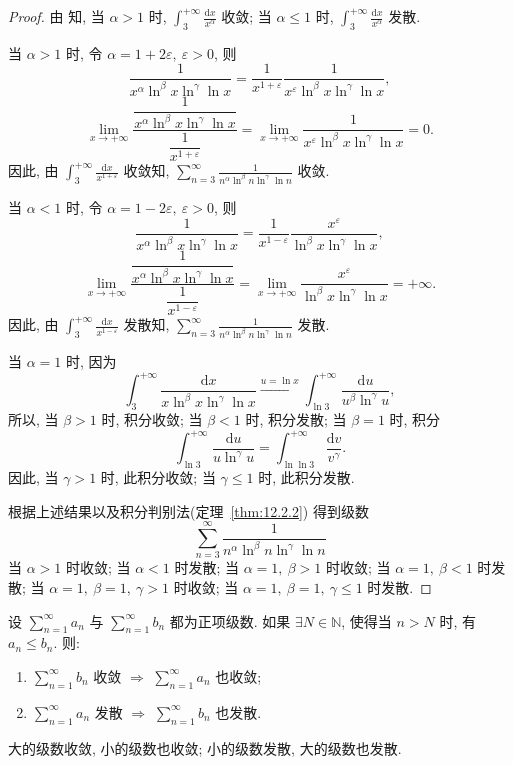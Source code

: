 \begin{proof}
由 知, 当 $\alpha>1$ 时, $\int_{3}^{+\infty}\frac{\mathrm{d}x}{x^{\alpha}}$ 收敛; 当 $\alpha\leqslant1$ 时, $\int_{3}^{+\infty}\frac{\mathrm{d}x}{x^{\alpha}}$ 发散.

当 $\alpha>1$ 时, 令 $\alpha=1+2\varepsilon,\ \varepsilon>0$, 则
\[
  \frac{1}{x^{\alpha}\ln^{\beta}x\ln^{\gamma}\ln x}
  =\frac{1}{x^{1+\varepsilon}}\frac{1}{x^{\varepsilon}\ln^{\beta}x\ln^{\gamma}\ln x},
\]
\[
  \lim_{x\to+\infty}\frac{\dfrac{1}{x^{\alpha}\ln^{\beta}x\ln^{\gamma}\ln x}}{\dfrac{1}{x^{1+\varepsilon}}}
  =\lim_{x\to+\infty}\frac{1}{x^{\varepsilon}\ln^{\beta}x\ln^{\gamma}\ln x}=0.
\]
因此, 由 $\int_{3}^{+\infty}\frac{\mathrm{d}x}{x^{1+\varepsilon}}$ 收敛知, $\sum_{n=3}^{\infty}\frac{1}{n^{\alpha}\ln^{\beta}n\ln^{\gamma}\ln n}$ 收敛.

当 $\alpha<1$ 时, 令 $\alpha=1-2\varepsilon,\ \varepsilon>0$, 则
\[
  \frac{1}{x^{\alpha}\ln^{\beta}x\ln^{\gamma}\ln x}
  =\frac{1}{x^{1-\varepsilon}}\frac{x^{\varepsilon}}{\ln^{\beta}x\ln^{\gamma}\ln x},
\]
\[
  \lim_{x\to+\infty}\frac{\dfrac{1}{x^{\alpha}\ln^{\beta}x\ln^{\gamma}\ln x}}{\dfrac{1}{x^{1-\varepsilon}}}
  =\lim_{x\to+\infty}\frac{x^{\varepsilon}}{\ln^{\beta}x\ln^{\gamma}\ln x}=+\infty.
\]
因此, 由 $\int_{3}^{+\infty}\frac{\mathrm{d}x}{x^{1-\varepsilon}}$ 发散知, $\sum_{n=3}^{\infty}\frac{1}{n^{\alpha}\ln^{\beta}n\ln^{\gamma}\ln n}$ 发散.

当 $\alpha=1$ 时, 因为
\[
  \int_{3}^{+\infty}\frac{\mathrm{d}x}{x\ln^{\beta}x\ln^{\gamma}\ln x}
  \xrightarrow{u=\ln x}\int_{\ln3}^{+\infty}\frac{\mathrm{d}u}{u^{\beta}\ln^{\gamma}u},
\]
所以, 当 $\beta>1$ 时, 积分收敛; 当 $\beta<1$ 时, 积分发散; 当 $\beta=1$ 时, 积分
\[
  \int_{\ln3}^{+\infty}\frac{\mathrm{d}u}{u\ln^{\gamma}u}
  =\int_{\ln\ln3}^{+\infty}\frac{\mathrm{d}v}{v^{\gamma}}.
\]
因此, 当 $\gamma>1$ 时, 此积分收敛; 当 $\gamma\leqslant1$ 时, 此积分发散.

根据上述结果以及积分判别法(定理~\ref{thm:12.2.2}) 得到级数
\[
  \sum_{n=3}^{\infty}\frac{1}{n^{\alpha}\ln^{\beta}n\ln^{\gamma}\ln n}
\]
当 $\alpha>1$ 时收敛; 当 $\alpha<1$ 时发散; 当 $\alpha=1,\ \beta>1$ 时收敛; 当 $\alpha=1,\ \beta<1$ 时发散; 当 $\alpha=1,\ \beta=1,\ \gamma>1$ 时收敛; 当 $\alpha=1,\ \beta=1,\ \gamma\leqslant1$ 时发散.
\end{proof}

\begin{theorem}[比较判别法]\label{thm:12.2.3}
设 $\sum_{n=1}^{\infty}a_{n}$ 与 $\sum_{n=1}^{\infty}b_{n}$ 都为正项级数. 如果 $\exists N\in\mathbb{N}$, 使得当 $n>N$ 时, 有 $a_{n}\leqslant b_{n}$. 则:
\begin{enumerate}
  \item $\sum_{n=1}^{\infty}b_{n}$ 收敛 $\Rightarrow$ $\sum_{n=1}^{\infty}a_{n}$ 也收敛;
  \item $\sum_{n=1}^{\infty}a_{n}$ 发散 $\Rightarrow$ $\sum_{n=1}^{\infty}b_{n}$ 也发散.
\end{enumerate}

大的级数收敛, 小的级数也收敛; 小的级数发散, 大的级数也发散.
\end{theorem}

